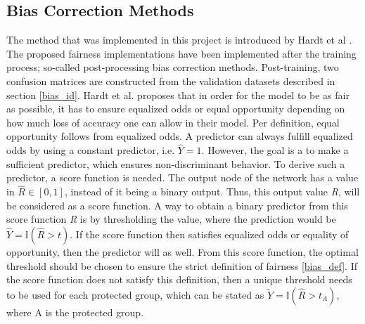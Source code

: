 \documentclass[11pt, fleqn, titlepage]{article}
\begin{document}
	\subsection{Bias Correction Methods}\label{biascorr}
	
	The method that was implemented in this project is introduced by Hardt et al \cite{equal_of_oppor}. The proposed fairness implementations have been implemented after the training process; so-called post-processing bias correction methods. Post-training, two confusion matrices are constructed from the validation datasets described in section \ref{bias_id}. Hardt et al. proposes that in order for the model to be as fair as possible, it has to ensure equalized odds or equal opportunity depending on how much loss of accuracy one can allow in their model. Per definition, equal opportunity follows from equalized odds. A predictor can always fulfill equalized odds by using a constant predictor, i.e. $ \hat Y = 1 $. However, the goal is a to make a sufficient predictor, which ensures non-discriminant behavior. To derive such a predictor, a score function is needed. The output node of the network has a value in $ \hat{R} \in [0,1] $, instead of it being a binary output. Thus, this output value \textit{R}, will be considered as a score function. A way to obtain a binary predictor from this score function \textit{R} is by thresholding the value, where the prediction would be $ \hat Y = \mathbb I (\hat{R} > t) $. If the score function then satisfies equalized odds or equality of opportunity, then the predictor will as well. From this score function, the optimal threshold should be chosen to ensure the strict definition of fairness \ref{bias_def}. If the score function does not satisfy this definition, then a unique threshold needs to be used for each protected group, which can be stated as $ \tilde Y = \mathbb I ( \hat{R} > t_A)$, where A is the protected group. 
	
\end{document}
